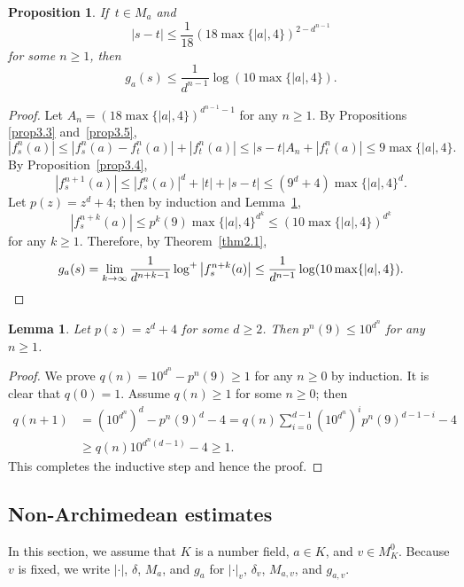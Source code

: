 \documentclass[11pt]{amsart}
\numberwithin{equation}{section}
\theoremstyle{plain}
\newtheorem{prop}[thm]{Proposition}
\newtheorem{lem}[thm]{Lemma}
\theoremstyle{definition}
\theoremstyle{remark}
\begin{document}
\begin{prop}\label{prop3.6}
  If\, $t\in M_{a}$ and
\[
|s-t|\leq\frac{1}{18}(18\max\{|a|,4\})^{2-d^{n-1}}
\]
for some $n\geq1$, then
\[
g_{a}(s)\leq\frac{1}{d^{n-1}}\log(10\max\{|a|,4\}).
\]
\end{prop}

\begin{proof}
Let $A_{n}=(18\max\{|a|,4\})^{d^{n-1}-1}$ for any $n\geq1$. By Propositions
\ref{prop3.3} and~\ref{prop3.5},
\[
|f_{s}^{n}(a)|\leq|f_{s}^{n}(a)-f_{t}^{n}(a)|+|f_{t}^{n}(a)|\leq|s-t|A_{n}+|f_{t}^{n}(a)|\leq9\max\{|a|,4\}.
\]
By Proposition~\ref{prop3.4},
\[
\left|f_{s}^{n+1}(a)\right|\leq|f_{s}^{n}(a)|^{d}+|t|+|s-t|\leq\left(9^{d}+4\right)\max\{|a|,4\}^{d}.
\]
Let $p(z)=z^{d}+4$; then by induction and Lemma~\ref{lem3.7},
\[
\left|f_{s}^{n+k}(a)\right|\leq p^{k}(9)\max\{|a|,4\}^{d^{k}}\leq(10\max\{|a|,4\})^{d^{k}}
\]
for any $k\geq1$. Therefore, by Theorem~\ref{thm2.1},
\[
g_{a}(s)=\lim_{k\to\infty}\frac{1}{d^{n+k-1}}\log^{+}\left|f_{s}^{n+k}(a)\right|\leq\frac{1}{d^{n-1}}\log(10\max\{|a|,4\}).\qedhere
\]
\end{proof}

\begin{lem}\label{lem3.7}
Let $p(z)=z^{d}+4$ for some $d\geq2$. Then $p^{n}(9)\leq10^{d^{n}}$
for any $n\geq1$.
\end{lem}

\begin{proof}
We prove $q(n)=10^{d^{n}}-p^{n}(9)\geq1$ for any $n\geq0$ by induction.
It is clear that $q(0)=1$. Assume $q(n)\geq1$ for some $n\geq0$;
then
\begin{align*}
q(n+1) & =\left(10^{d^{n}}\right)^{d}-p^{n}(9)^{d}-4=q(n){\textstyle \sum_{i=0}^{d-1}}\left(10^{d^{n}}\right)^{i}p^{n}(9)^{d-1-i}-4\\
 & \geq q(n)10^{d^{n}(d-1)}-4\geq1.
\end{align*}
This completes the inductive step and hence the proof.
\end{proof}

\subsection{Non-Archimedean estimates}\label{sec3.2}

In this section, we assume that $K$ is a number field, $a\in K$,
and $v\in M_{K}^{0}$. Because $v$ is fixed, we write $|\cdot|$,
$\delta$, $M_{a}$, and $g_{a}$ for $|\cdot|_{v}$, $\delta_{v}$,
$M_{a,v}$, and $g_{a,v}$.
\end{document}

